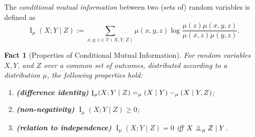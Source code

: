 \documentclass[letterpaper]{article} %
\theoremstyle{plain}
\newtheorem{fact}[theorem]{Fact}
\theoremstyle{definition}
\theoremstyle{remark}
\let\H\relax
\DeclareMathOperator{\H}{\mathrm{H}} %
\DeclareMathOperator{\I}{\mathrm{I}} %
\newcommand{\CI}{\mathrel{\perp\mspace{-10mu}\perp}} %
\newcommand{\V}{\mathcal V}
\begin{document}
\begin{defn}\label{defn:cmi}
   The \emph{conditional mutual information} between two (sets of) random
    variables is defined as  
    \[ \I_\mu(X ; Y \mid Z) := \sum_{x,y,z \in \V(X,Y,Z)} \mu(x,y,z)
        \log\frac{\mu(z) \mu(x,y,z)}{\mu(x,z)\mu(y,z)}. \] 
\end{defn}


\begin{fact}[Properties of Conditional Mutual Information]\label{fact:cmi}
% 
For random variables $X,Y$, and $Z$ over a common set of outcomes,
distributed according to a distribution $\mu$,
the following properties hold:
\begin{enumerate}
    \item \textbf{(difference identity)} $\I_\mu(X ; Y \mid Z) =
                  \H_\mu(X \mid Y) - \H_\mu(X \mid Y, Z)$; 
   \item \textbf{(non-negativity)} $\I_\mu({ X }; { Y} \mid {Z}) \ge 0$;
    \item \textbf{(relation to independence)} $\I_\mu({ X }; { Y}
         \mid { Z}) = 0$ iff $X \CI_\mu Z \mid Y$.
\end{enumerate}
\end{fact}
\end{document}
